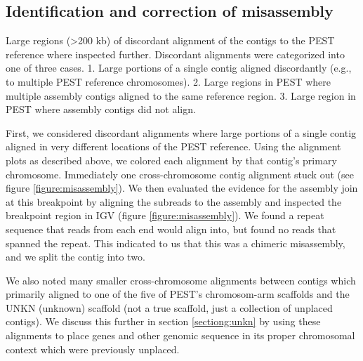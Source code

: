 \subsection{Identification and correction of misassembly}

\par{
Large regions (>200 kb) of discordant alignment of the contigs to the PEST reference where inspected further. Discordant alignments were categorized into one of three cases. 1. Large portions of a single contig aligned discordantly (e.g., to multiple PEST reference chromosomes). 2. Large regions in PEST where multiple assembly contigs aligned to the same reference region.  3. Large region in PEST where assembly contigs did not align. 
} \\
\par{
First, we considered discordant alignments where large portions of a single contig aligned in very different locations of the PEST reference. Using the alignment plots as described above, we colored each alignment by that contig's primary chromosome. Immediately one cross-chromosome contig alignment stuck out (see figure \ref{figure:misassembly}). We then evaluated the evidence for the assembly join at this breakpoint by aligning the subreads to the assembly and inspected the breakpoint region in IGV (figure \ref{figure:misassembly}). We found a repeat sequence that reads from each end would align into, but found no reads that spanned the repeat. This indicated to us that this was a chimeric misassembly, and we split the contig into two.
} \\
\par{
We also noted many smaller cross-chromosome alignments between contigs which primarily aligned to one of the five of PEST's chromosom-arm scaffolds and the UNKN (unknown) scaffold (not a true scaffold, just a collection of unplaced contigs). We discuss this further in section \ref{sectiong:unkn} by using these alignments to place genes and other genomic sequence in its proper chromosomal context which were previously unplaced.
}

